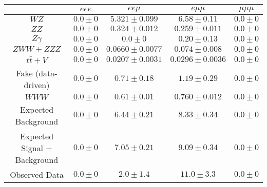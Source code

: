 \begin{tabular}{|c||c|c|c|c|}
\hline
 & $eee$ & $ee\mu$ & $e\mu\mu$ & $\mu\mu\mu$\\ 
\hline\hline
$WZ$ &  $0.0 \pm 0$ &  $5.321 \pm 0.099$ &  $6.58 \pm 0.11$ &  $0.0 \pm 0$\\ 
$ZZ$ &  $0.0 \pm 0$ &  $0.324 \pm 0.012$ &  $0.259 \pm 0.011$ &  $0.0 \pm 0$\\ 
$Z\gamma$ &  $0.0 \pm 0$ &  $0.0 \pm 0$ &  $0.20 \pm 0.13$ &  $0.0 \pm 0$\\ 
$ZWW+ZZZ$ &  $0.0 \pm 0$ &  $0.0660 \pm 0.0077$ &  $0.074 \pm 0.008$ &  $0.0 \pm 0$\\ 
$t\bar{t}+V$ &  $0.0 \pm 0$ &  $0.0207 \pm 0.0031$ &  $0.0296 \pm 0.0036$ &  $0.0 \pm 0$\\ 
Fake (data-driven) &  $0.0 \pm 0$ &  $0.71 \pm 0.18$ &  $1.19 \pm 0.29$ &  $0.0 \pm 0$\\ 
$WWW$ &  $0.0 \pm 0$ &  $0.61 \pm 0.01$ &  $0.760 \pm 0.012$ &  $0.0 \pm 0$\\ 
\hline
Expected Background &  $0.0 \pm 0$ &  $6.44 \pm 0.21$ &  $8.33 \pm 0.34$ &  $0.0 \pm 0$\\ 
Expected Signal + Background &  $0.0 \pm 0$ &  $7.05 \pm 0.21$ &  $9.09 \pm 0.34$ &  $0.0 \pm 0$\\ 
\hline
Observed Data &  $0.0 \pm 0$ &  $2.0 \pm 1.4$ &  $11.0 \pm 3.3$ &  $0.0 \pm 0$\\ 
\hline
\end{tabular}
